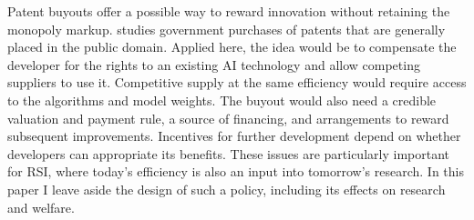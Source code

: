 Patent buyouts offer a possible way to reward innovation without retaining the monopoly markup. \citet{kremer1998} studies government purchases of patents that are generally placed in the public domain. Applied here, the idea would be to compensate the developer for the rights to an existing AI technology and allow competing suppliers to use it. Competitive supply at the same efficiency would require access to the algorithms and model weights.
The buyout would also need a credible valuation and payment rule, a source of financing, and arrangements to reward subsequent improvements. Incentives for further development depend on whether developers can appropriate its benefits. These issues are
particularly important for RSI, where today's efficiency is also an input into tomorrow's research. In this paper I leave aside the design of such a policy, including its effects on research and welfare.
